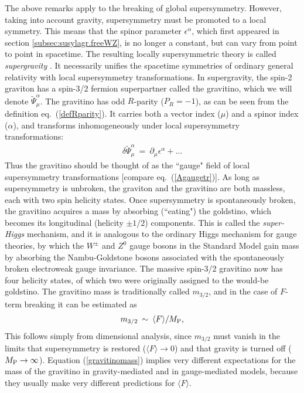 \documentclass[11pt]{article}
\def\beq{\begin{eqnarray}}
\def\eeq{\end{eqnarray}}
\def\stilde{\widetilde}
\def\MPlanck{M_{\rm P}}
\begin{document}
The above remarks apply to the breaking of global supersymmetry. However, 
taking into account gravity, supersymmetry must be promoted to a local 
symmetry. This means that the spinor parameter $\epsilon^\alpha$, which 
first appeared in section \ref{subsec:susylagr.freeWZ}, is no longer a 
constant, but can vary from point to point in spacetime. The resulting 
locally supersymmetric theory is called {\it supergravity} 
\cite{supergravity,superconformalsupergravity}. 
It necessarily unifies the spacetime 
symmetries of ordinary general relativity with local supersymmetry 
transformations. In supergravity, the spin-2 graviton has a spin-3/2 
fermion superpartner called the gravitino, which we will denote $\stilde 
\Psi_\mu^\alpha$. The gravitino has odd $R$-parity ($P_R=-1$), as can be 
seen from the definition eq.~(\ref{defRparity}). It carries both a vector 
index ($\mu$) and a spinor index ($\alpha$), and transforms 
inhomogeneously under local supersymmetry transformations:
\beq
\delta \stilde\Psi_\mu^\alpha \>=\> 
\partial_\mu\epsilon^\alpha +\ldots
\label{gravitinoisgauge}
\eeq
Thus the gravitino should be thought of as the ``gauge" field of local
supersymmetry transformations [compare eq.~(\ref{Agaugetr})]. As long as
supersymmetry is unbroken, the graviton and the gravitino are both
massless, each with two spin helicity states. Once supersymmetry is
spontaneously broken, the gravitino acquires a mass by absorbing
(``eating") the goldstino, which becomes its longitudinal (helicity $\pm
1/2$) components. This is called the {\it super-Higgs} mechanism, and it
is analogous to the ordinary Higgs mechanism for gauge theories, by which the
$W^\pm$ and $Z^0$ gauge bosons in the Standard Model gain mass by
absorbing the Nambu-Goldstone bosons associated with the spontaneously
broken electroweak gauge invariance. The massive spin-3/2 gravitino now
has four helicity states, of which two were originally assigned to the
would-be goldstino. The gravitino mass is traditionally called $m_{3/2}$,
and in the case of $F$-term breaking it can be estimated as
\cite{gravitinomassref}
\beq
m_{3/2} \>\sim\> {\langle F \rangle / \MPlanck},
\label{gravitinomass}
\eeq
This follows simply from dimensional analysis, since $m_{3/2}$ must vanish 
in the limits that supersymmetry is restored ($\langle F \rangle 
\rightarrow 0$) and that gravity is turned off ($\MPlanck \rightarrow 
\infty$). 
Equation (\ref{gravitinomass}) implies very different expectations for the 
mass of the gravitino in gravity-mediated and in gauge-mediated models, 
because they usually make very different predictions for $\langle F 
\rangle$.
\end{document}
